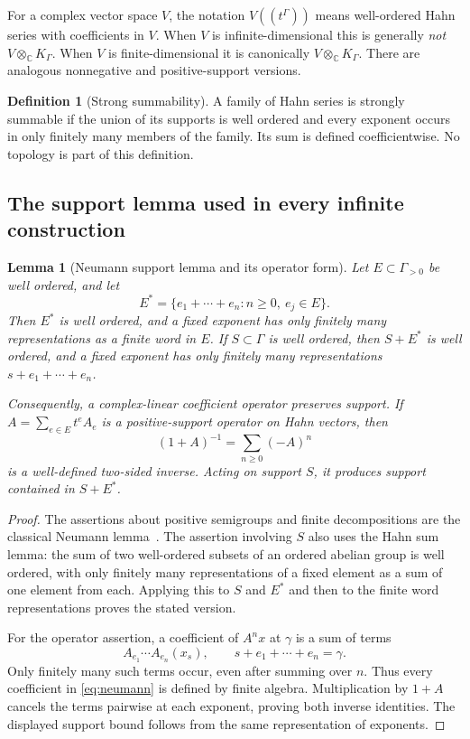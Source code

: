 \documentclass[11pt,letterpaper]{article}
\numberwithin{equation}{section}
\newtheorem{lemma}[theorem]{Lemma}
\theoremstyle{definition}
\newtheorem{definition}[theorem]{Definition}
\theoremstyle{remark}
\newcommand{\C}{\mathbb C}
\newcommand{\Kg}{K_\Gamma}
\newcommand{\ot}{\otimes_{\C}}
\begin{document}
For a complex vector space $V$, the notation $V((t^\Gamma))$ means
well-ordered Hahn series with coefficients in $V$. When $V$ is
infinite-dimensional this is generally \emph{not} $V\ot\Kg$.
When $V$ is finite-dimensional it is canonically $V\ot\Kg$.
There are analogous nonnegative and positive-support versions.

\begin{definition}[Strong summability]
A family of Hahn series is strongly summable if the union of its supports
is well ordered and every exponent occurs in only finitely many members
of the family. Its sum is defined coefficientwise. No topology is part
of this definition.
\end{definition}

\subsection{The support lemma used in every infinite construction}
\begin{lemma}[Neumann support lemma and its operator form]
\label{lem:neumann}
Let $E\subset\Gamma_{>0}$ be well ordered, and let
\[
 E^*=\{e_1+\cdots+e_n:n\ge0,\ e_j\in E\}.
\]
Then $E^*$ is well ordered, and a fixed exponent has only finitely many
representations as a finite word in $E$. If $S\subset\Gamma$ is well
ordered, then $S+E^*$ is well ordered, and a fixed exponent has only
finitely many representations $s+e_1+\cdots+e_n$.

Consequently, a complex-linear coefficient operator preserves support.
If $A=\sum_{e\in E}t^e A_e$ is a positive-support operator on Hahn vectors,
then
\begin{equation}
 (1+A)^{-1}=\sum_{n\ge0}(-A)^n
 \label{eq:neumann}
\end{equation}
is a well-defined two-sided inverse. Acting on support $S$, it produces
support contained in $S+E^*$.
\end{lemma}
\begin{proof}
The assertions about positive semigroups and finite decompositions are
the classical Neumann lemma~\cite{neumann}. The assertion involving $S$
also uses the Hahn sum lemma: the sum of two well-ordered subsets of an
ordered abelian group is well ordered, with only finitely many
representations of a fixed element as a sum of one element from each.
Applying this to $S$ and $E^*$ and then to the finite word
representations proves the stated version.

For the operator assertion, a coefficient of $A^n x$ at $\gamma$ is a
sum of terms
\[
 A_{e_1}\cdots A_{e_n}(x_s),\qquad
 s+e_1+\cdots+e_n=\gamma.
\]
Only finitely many such terms occur, even after summing over $n$.
Thus every coefficient in \eqref{eq:neumann} is defined by finite
algebra. Multiplication by $1+A$ cancels the terms pairwise at each
exponent, proving both inverse identities. The displayed support bound
follows from the same representation of exponents.
\end{proof}
\end{document}
